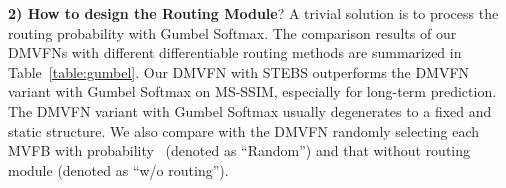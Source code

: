 \documentclass[10pt,twocolumn,letterpaper]{article}
\begin{document}
\begin{table}[th]
\caption{\textbf{Routing Module based on STEBS is effective}. The evaluation metric is MS-SSIM ().}

\centering
{}
\label{table:gumbel}
\end{table}

\noindent
\textbf{2) How to design the Routing Module}? A trivial solution is to process the routing probability  with Gumbel Softmax. The comparison results of our DMVFNs with different differentiable routing methods are summarized in Table~\ref{table:gumbel}. Our DMVFN with STEBS outperforms the DMVFN variant with Gumbel Softmax on MS-SSIM, especially for long-term prediction. The DMVFN variant with Gumbel Softmax usually degenerates to a fixed and static structure. We also compare with the DMVFN randomly selecting each MVFB with probability ~(denoted as ``Random'') and that without routing module (denoted as ``w/o routing'').

\begin{table}[th]
\caption{\textbf{Results of our DMVFN with different scaling factor settings}. The evaluation metric is MS-SSIM ().}
\centering
{}
\label{table:blocks}
\end{table}
\end{document}
